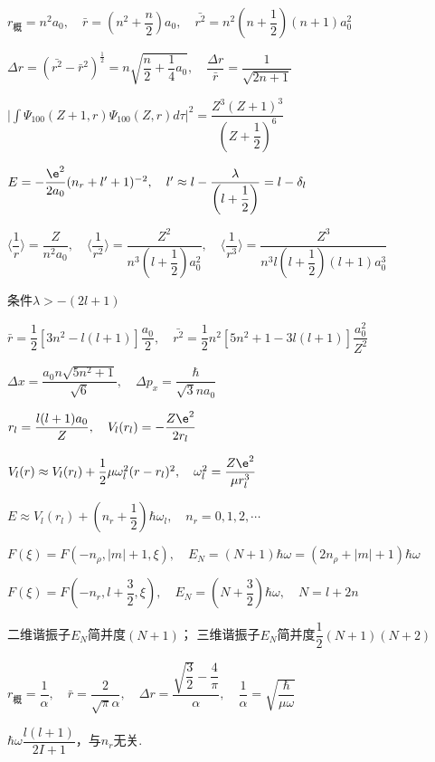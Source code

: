 \answer $ r_{\text{概}}=n^{2}a_{0},\quad \bar{r}=\left(n^{2}+\dfrac{n}{2}\right)a_{0},\quad \bar{r^{2}}=n^{2}\left(n+\dfrac{1}{2}\right)(n+1)a_{0}^{2} $

	$ \Delta r=(\bar{r^{2}}-\bar{r}^{2})^{\frac{1}{2}}=n\sqrt{\dfrac{n}{2}+\dfrac{1}{4}a_{0}},\quad \dfrac{\Delta r}{\bar{r}}=\dfrac{1}{\sqrt{2n+1}} $

\answer $ \bigg|\int\varPsi_{100}(Z+1,r)\varPsi_{100}(Z,r)d\tau \bigg|^{2}=\dfrac{Z^{3}(Z+1)^{3}}{\left(Z+\dfrac{1}{2}\right)^{6}} $

\answer $ E=-\dfrac{\e^{2}}{2a_{0}}(n_{r}+l^{\prime}+1)^{-2},\quad l^{\prime}\approx l-\dfrac{\lambda}{\left(l+\dfrac{1}{2}\right)}=l-\delta_{l} $


\answer $ \langle\dfrac{1}{r}\rangle=\dfrac{Z}{n^{2}a_{0}},\quad \langle\dfrac{1}{r^{2}}\rangle=\dfrac{Z^{2}}{n^{3}\left(l+\dfrac{1}{2}\right)a_{0}^{2}},\quad \langle\dfrac{1}{r^{3}}\rangle=\dfrac{Z^{3}}{n^{3}l\left(l+\dfrac{1}{2}\right)(l+1)a_{0}^{3}} $

\answer 条件$ \lambda>-(2l+1) $

\answer $ \bar{r}=\dfrac{1}{2}[3n^{2}-l(l+1)]\dfrac{a_{0}}{2},\quad \bar{r^{2}}=\dfrac{1}{2}n^{2}[5n^{2}+1-3l(l+1)]\dfrac{a_{0}^{2}}{Z^{2}} $

\answer $ \Delta x=\dfrac{a_{0}n\sqrt{5n^{2}+1}}{\sqrt{6}},\quad \Delta p_{x}=\dfrac{\hbar}{\sqrt{3}na_{0}} $

\answer $ r_{l}=\dfrac{l(l+1)a_{0}}{Z},\quad V_{l}(r_{l})=-\dfrac{Z\e^{2}}{2r_{l}} $

	$ V_{l}(r)\approx V_{l}(r_{l})+\dfrac{1}{2}\mu\omega_{l}^{2}(r-r_{l})^{2},\quad \omega_{l}^{2}=\dfrac{Z\e^{2}}{\mu r_{l}^{3}} $
	
	$ E\approx V_{l}(r_{l})+\left(n_{r}+\dfrac{1}{2}\right)\hbar\omega_{l},\quad n_{r}=0,1,2,\cdots $

\answer $ F(\xi)=F(-n_{\rho},|m|+1,\xi),\quad E_{N}=(N+1)\hbar\omega=(2n_{\rho}+|m|+1)\hbar\omega $

\answer $ F(\xi)=F\left(-n_{r},l+\dfrac{3}{2},\xi\right),\quad E_{N}=\left(N+\dfrac{3}{2}\right)\hbar\omega,\quad N=l+2n $

\answer 二维谐振子$E_{N}$简并度$(N+1)$； 三维谐振子$E_{N}$简并度$\dfrac{1}{2}(N+1)( N+2)$

\answer $ r_{\text{概}}=\dfrac{1}{\alpha},\quad \bar{r}=\dfrac{2}{\sqrt{\pi}\alpha},\quad \Delta r=\dfrac{\sqrt{\dfrac{3}{2}}-\dfrac{4}{\pi}}{\alpha},\quad \dfrac{1}{\alpha}=\sqrt{\dfrac{\hbar}{\mu\omega}} $

\answer $ \hbar\omega\dfrac{l(l+1)}{2I+1} $，与$n_{r}$无关.